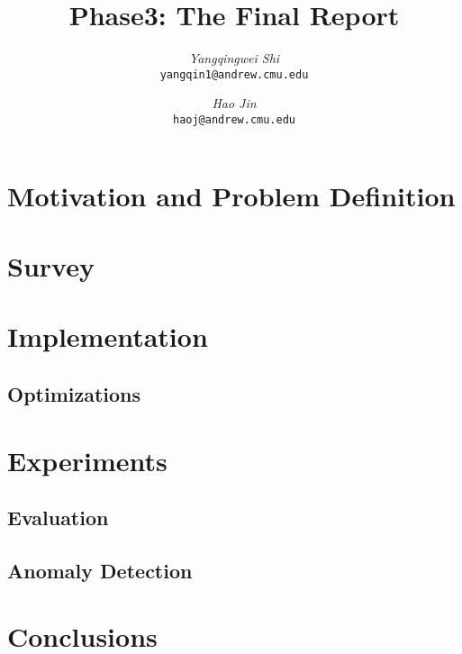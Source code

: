 \documentclass[12pt]{article}
\begin{document}
\newcommand{\beq}{\begin{equation}}
\newcommand{\eeq}{\end{equation}}
\newcommand{\bit}{\begin{itemize*}}
\newcommand{\eit}{\end{itemize*}}
\newcommand{\goal}[1]{ {\noindent {$\Rightarrow$} \em {#1} } }
\newcommand{\hide}[1]{}
\newcommand{\comment}[1]{ {\footnotesize {#1} } }
\newtheorem{lemma}{Lemma}
\newtheorem{theorem}{Theorem}
\newtheorem{proof}{Proof}
\newtheorem{defn}{Definition}
\newtheorem{algo}{Algorithm}
\newtheorem{observation}{Observation}

\title{Phase3: The Final Report}


\author{ {\em Yangqingwei Shi} \\	   
	    {\tt yangqin1@andrew.cmu.edu}
	 \and
	 {\em Hao Jin} \\
	     {\tt haoj@andrew.cmu.edu}}
\maketitle

\section{Motivation and Problem Definition}
    \label{sec:intro}
    
\newpage
\section{Survey}
    \label{sec:survey}
    
	   
\newpage
\section{Implementation}
\subsection{Optimizations}
	\label{sec:imp}
	
	
\newpage
\section{Experiments}
\subsection{Evaluation}
	\label{sec:expeval}
	
	
\subsection{Anomaly Detection}
	\label{sec:expanal}
	

\newpage
\section{Conclusions}
	\label{sec:concl}
	







\newpage
{}
\end{document}

